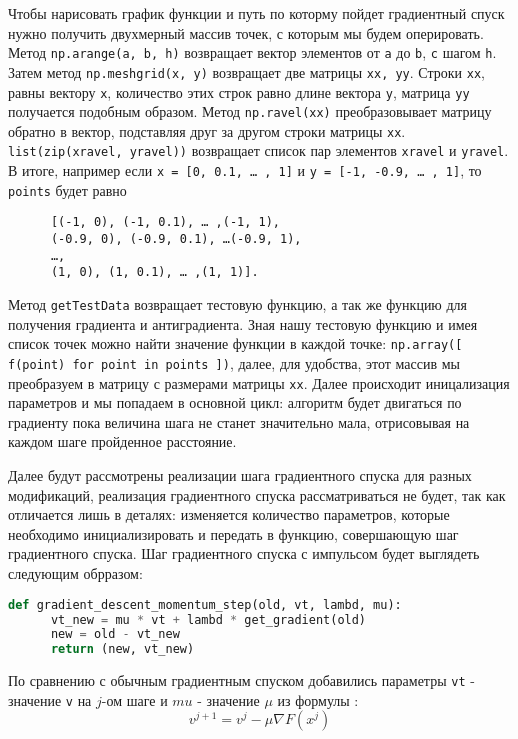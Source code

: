 \documentclass[12pt]{report}
\begin{document}
  Чтобы нарисовать график функции и путь по которму пойдет градиентный спуск
  нужно получить двухмерный массив точек, с которым мы будем оперировать. Метод
  \verb|np.arange(a, b, h)| возвращает вектор элементов от \verb|a| до \verb|b|,
  \verb|с| шагом \verb|h|. Затем метод \verb|np.meshgrid(x, y)| возвращает две
  матрицы \verb|xx, yy|. Строки \verb|xx|, равны вектору \verb|x|, количество
  этих строк равно длине вектора \verb|y|, матрица \verb|yy| получается подобным
  образом. Метод \verb|np.ravel(xx)| преобразовывает матрицу обратно в вектор,
  подставляя друг за другом строки матрицы \verb|xx|. \verb|list(zip(xravel, yravel))|
  возвращает список пар элементов \verb|xravel| и \verb|yravel|. В итоге,
  например если \verb|x = [0, 0.1, … , 1]| и \verb|y = [-1, -0.9, … , 1]|, то
  \verb|points| будет равно
  \begin{center}
    \begin{verbatim}
      [(-1, 0), (-1, 0.1), … ,(-1, 1),
      (-0.9, 0), (-0.9, 0.1), …(-0.9, 1),
      …,
      (1, 0), (1, 0.1), … ,(1, 1)].
    \end{verbatim}
  \end{center}
	Метод \verb|getTestData| возвращает тестовую функцию, а так же функцию для
  получения градиента и антиградиента. Зная нашу тестовую функцию и имея список
  точек можно найти значение функции в каждой точке:
  \verb|np.array([ f(point) for point in points ])|, далее, для удобства, этот
  массив мы преобразуем в матрицу с размерами матрицы \verb|xx|. Далее происходит
  иницализация параметров и мы попадаем в основной цикл: алгоритм будет двигаться
  по градиенту пока величина шага не станет значительно мала, отрисовывая на
  каждом шаге пройденное расстояние.

  Далее будут рассмотрены реализации шага градиентного спуска для разных модификаций,
  реализация градиентного спуска рассматриваться не будет, так как отличается
  лишь в деталях: изменяется количество параметров, которые необходимо
  инициализировать и передать в функцию, совершающую шаг градиентного спуска.
	Шаг градиентного спуска с импульсом будет выглядеть следующим обрразом:

  \begin{lstlisting}[language=Python, frame=single]
    def gradient_descent_momentum_step(old, vt, lambd, mu):
      vt_new = mu * vt + lambd * get_gradient(old)
      new = old - vt_new
      return (new, vt_new)
  \end{lstlisting}

  По сравнению с обычным градиентным спуском добавились параметры \verb|vt| -
  значение \verb|v| на $j$-ом шаге и $mu$ - значение $\mu$ из формулы :
  $$v^{j+1}=v^j-\mu\nabla F(x^j)$$
\end{document}

